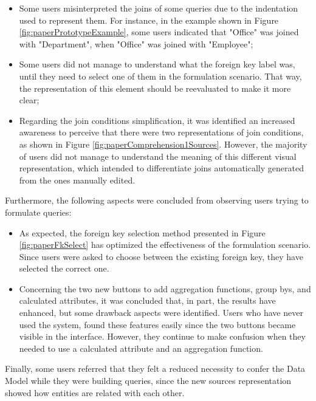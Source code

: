 \begin{itemize}
  \item Some users misinterpreted the joins of some queries due to the indentation used to represent them. For instance, in the example shown in Figure \ref{fig:paperPrototypeExample}, some users indicated that "Office" was joined with "Department", when "Office" was joined with "Employee";
  \item Some users did not manage to understand what the foreign key label was, until they need to select one of them in the formulation scenario. That way, the representation of this element should be reevaluated to make it more clear;
  \item Regarding the join conditions simplification, it was identified an increased awareness to perceive that there were two representations of join conditions, as shown in Figure \ref{fig:paperComprehension1Sources}. However, the majority of users did not manage to understand the meaning of this different visual representation, which intended to differentiate joins automatically generated from the ones manually edited.
\end{itemize}

Furthermore, the following aspects were concluded from observing users trying to formulate queries:

\begin{itemize}
  \item As expected, the foreign key selection method presented in Figure \ref{fig:paperFkSelect} has optimized the effectiveness of the formulation scenario. Since users were asked to choose between the existing foreign key, they have selected the correct one.
  \item Concerning the two new buttons to add aggregation functions, group bys, and calculated attributes, it was concluded that, in part, the results have enhanced, but some drawback aspects were identified. Users who have never used the system, found these features easily since the two buttons became visible in the interface. However, they continue to make confusion when they needed to use a calculated attribute and an aggregation function.
\end{itemize}

Finally, some users referred that they felt a reduced necessity to confer the Data Model while they were building queries, since the new sources representation showed how entities are related with each other.




